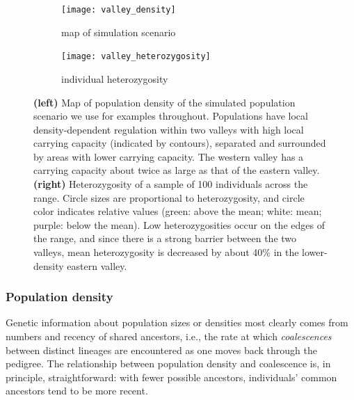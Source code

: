 \documentclass{ar-1col}
\renewcommand{\emph}[1]{{\textit{#1}}}
\begin{document}
\begin{figure}	%
    \centering
    \begin{subfigure}{0.95\textwidth}
        \centering
        \texttt{[image: valley\_density]}
        \caption{map of simulation scenario}
        \label{valley_map}
    \end{subfigure}
    \begin{subfigure}{0.95\textwidth}
        \centering
        \texttt{[image: valley\_heterozygosity]}
        \caption{individual heterozygosity}
        \label{valley_het}
    \end{subfigure}
        \caption{
            \textbf{(left)} Map of population density of the simulated population scenario
            we use for examples throughout.
            Populations have local density-dependent regulation
            within two valleys with high local carrying capacity (indicated by contours),
            separated and surrounded by areas with lower carrying capacity.
            The western valley has a carrying capacity about twice as large as that of the eastern valley.
            \textbf{(right)} Heterozygosity of a sample of 100 individuals across the range.
            Circle sizes are proportional to heterozygosity,
            and circle color indicates relative values
            (green: above the mean; white: mean; purple: below the mean).
            Low heterozygosities occur on the edges of the range,
            and since there is a strong barrier between the two valleys,
            mean heterozygosity is decreased by about 40\% in the lower-density eastern valley.
		}
        \label{pop_density}
\end{figure}



\subsubsection{Population density}

Genetic information about population sizes or densities most clearly
comes from numbers and recency of shared ancestors, 
i.e., the rate at which \emph{coalescences} between distinct lineages
are encountered as one moves back through the pedigree.
The relationship between population density and coalescence is, in principle, straightforward:
with fewer possible ancestors,
individuals' common ancestors tend to be more recent.
\end{document}
